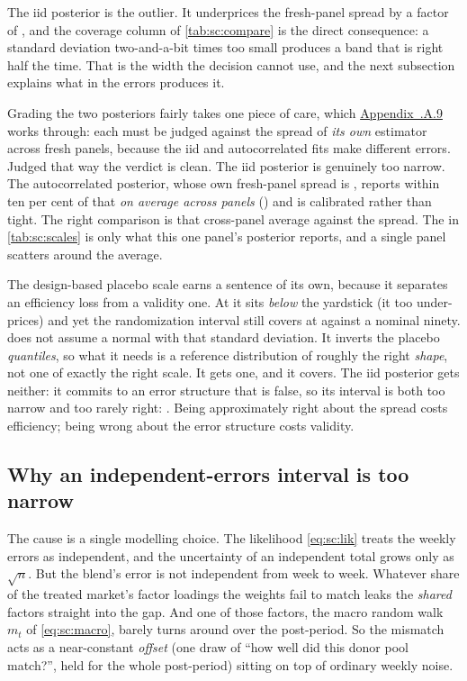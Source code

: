 

The iid posterior is the outlier. It underprices the fresh-panel spread by a factor of
\nbSevenUnderprice{}, and the coverage column of \cref{tab:sc:compare} is the direct consequence: a
standard deviation two-and-a-bit times too small produces a band that is right half the time. That
is the width the decision cannot use, and the next subsection explains what in the errors produces
it.

Grading the two posteriors fairly takes one piece of care, which
\hyperref[app:sc:referee]{Appendix~\thechapter.A.9} works through: each must be judged against the
spread of \emph{its own} estimator across fresh panels, because the iid and autocorrelated fits make
different errors. Judged that way the verdict is clean. The iid posterior is genuinely too narrow.
The autocorrelated posterior, whose own fresh-panel spread is \keur{\nbSevenSeedSdArone}, reports
within ten per cent of that \emph{on average across panels} (\keur{\nbSevenAroneCrosspanelSd}) and is
calibrated rather than tight. The right comparison is that cross-panel average
\keur{\nbSevenAroneCrosspanelSd} against the \keur{\nbSevenSeedSdArone} spread. The
\keur{\nbSevenBayesSd} in \cref{tab:sc:scales} is only what this one panel's posterior reports, and
a single panel scatters around the average.

The design-based placebo scale earns a sentence of its own, because it separates an efficiency loss
from a validity one. At \keur{\nbSevenPlaceboSd} it sits \pc{\nbSevenPlaceboSdErrPct} \emph{below}
the yardstick (it too under-prices) and yet the randomization interval still covers at
\pc{\nbSevenRiCov} against a nominal ninety.  does not assume a normal with that
standard deviation. It inverts the placebo \emph{quantiles}, so what it needs is a reference
distribution of roughly the right \emph{shape}, not one of exactly the right scale. It gets one,
and it covers. The iid posterior gets neither: it commits to an error structure that is false, so
its interval is both too narrow and too rarely right: \pc{\nbSevenTotalCov}. Being approximately
right about the spread costs efficiency; being wrong about the error structure costs validity.

\subsection*{Why an independent-errors interval is too narrow}

The cause is a single modelling choice. The likelihood \cref{eq:sc:lik} treats the weekly errors as
independent, and the uncertainty of an independent total grows only as $\sqrt{n}$. But the blend's
error is not independent from week to week. Whatever share of the treated market's factor loadings
the weights fail to match leaks the \emph{shared} factors straight into the gap. And one of those
factors, the macro random walk $m_t$ of \cref{eq:sc:macro}, barely turns around over the
post-period. So the mismatch acts as a near-constant \emph{offset} (one draw of ``how well did
this donor pool match?'', held for the whole post-period) sitting on top of ordinary weekly
noise.

